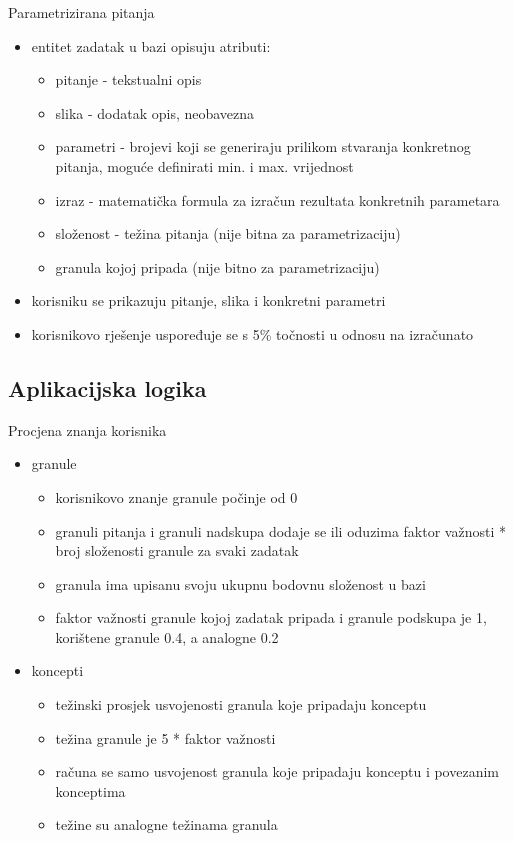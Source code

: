 \documentclass[times, utf8, numeric]{beamer}
\begin{document}
\begin{frame}{Parametrizirana pitanja}
\begin{itemize}
	\item entitet zadatak u bazi opisuju atributi:
	\begin{itemize}
		\item pitanje - tekstualni opis
		\item slika - dodatak opis, neobavezna
		\item parametri - brojevi koji se generiraju prilikom stvaranja konkretnog pitanja, moguće definirati min. i max. vrijednost
		\item izraz - matematička formula za izračun rezultata konkretnih parametara
		\item složenost - težina pitanja (nije bitna za parametrizaciju)
		\item granula kojoj pripada (nije bitno za parametrizaciju)
	\end{itemize}
	\item korisniku se prikazuju pitanje, slika i konkretni parametri
	\item korisnikovo rješenje uspoređuje se s 5\% točnosti u odnosu na izračunato
\end{itemize}
\end{frame}

\subsection{Aplikacijska logika}
\begin{frame}{Procjena znanja korisnika}
\begin{itemize}
	\item granule
	\begin{itemize}
		\item korisnikovo znanje granule počinje od 0
		\item granuli pitanja i granuli nadskupa dodaje se ili oduzima faktor važnosti * broj složenosti granule za svaki zadatak
		\item granula ima upisanu svoju ukupnu bodovnu složenost u bazi
		\item faktor važnosti granule kojoj zadatak pripada i granule podskupa je 1, korištene granule 0.4, a analogne 0.2
	\end{itemize}
	\item koncepti
	\begin{itemize}
		\item težinski prosjek usvojenosti granula koje pripadaju konceptu
		\item težina granule je 5 * faktor važnosti
		\item računa se samo usvojenost granula koje pripadaju konceptu i povezanim konceptima
		\item težine su analogne težinama granula
	\end{itemize}
\end{itemize}
\end{frame}
\end{document}

